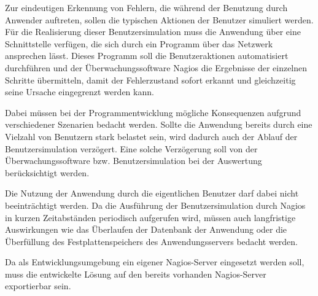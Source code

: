 Zur eindeutigen Erkennung von Fehlern, die während der Benutzung durch Anwender auftreten, sollen die typischen Aktionen der Benutzer simuliert werden. 
Für die Realisierung dieser Benutzersimulation muss die Anwendung über eine Schnittstelle verfügen, die sich durch ein Programm über das Netzwerk ansprechen lässt.
Dieses Programm soll die Benutzeraktionen automatisiert durchführen und der Überwachungssoftware Nagios die Ergebnisse der einzelnen Schritte übermitteln, damit der Fehlerzustand sofort erkannt und gleichzeitig seine Ursache eingegrenzt werden kann.

Dabei müssen bei der Programmentwicklung mögliche Konsequenzen aufgrund verschiedener Szenarien bedacht werden.
Sollte die Anwendung bereits durch eine Vielzahl von Benutzern stark belastet sein, wird dadurch auch der Ablauf der Benutzersimulation verzögert.
Eine solche Verzögerung soll von der Überwachungssoftware bzw. Benutzersimulation bei der Auswertung berücksichtigt werden.

Die Nutzung der Anwendung durch die eigentlichen Benutzer darf dabei nicht beeinträchtigt werden.
Da die Ausführung der Benutzersimulation durch Nagios in kurzen Zeitabständen periodisch aufgerufen wird, müssen auch langfristige Auswirkungen wie das Überlaufen der Datenbank der Anwendung oder die Überfüllung des Festplattenspeichers des Anwendungsservers bedacht werden.

Da als Entwicklungsumgebung ein eigener Nagios-Server eingesetzt werden soll, muss die entwickelte Lösung auf den bereits vorhanden Nagios-Server exportierbar sein.


